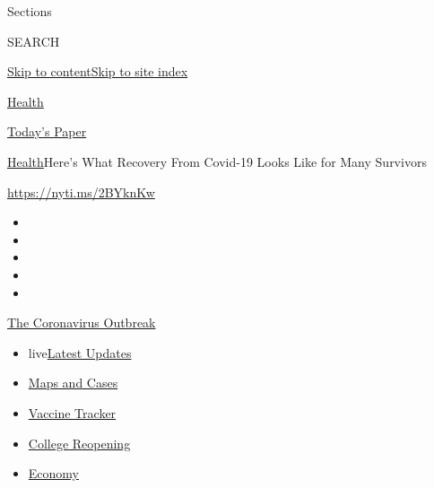 Sections

SEARCH

\protect\hyperlink{site-content}{Skip to
content}\protect\hyperlink{site-index}{Skip to site index}

\href{https://www.nytimes3xbfgragh.onion/section/health}{Health}

\href{https://myaccount.nytimes3xbfgragh.onion/auth/login?response_type=cookie\&client_id=vi}{}

\href{https://www.nytimes3xbfgragh.onion/section/todayspaper}{Today's
Paper}

\href{/section/health}{Health}\textbar{}Here's What Recovery From
Covid-19 Looks Like for Many Survivors

\url{https://nyti.ms/2BYknKw}

\begin{itemize}
\item
\item
\item
\item
\item
\end{itemize}

\href{https://www.nytimes3xbfgragh.onion/news-event/coronavirus?action=click\&pgtype=Article\&state=default\&region=TOP_BANNER\&context=storylines_menu}{The
Coronavirus Outbreak}

\begin{itemize}
\tightlist
\item
  live\href{https://www.nytimes3xbfgragh.onion/2020/08/04/world/coronavirus-covid-19.html?action=click\&pgtype=Article\&state=default\&region=TOP_BANNER\&context=storylines_menu}{Latest
  Updates}
\item
  \href{https://www.nytimes3xbfgragh.onion/interactive/2020/us/coronavirus-us-cases.html?action=click\&pgtype=Article\&state=default\&region=TOP_BANNER\&context=storylines_menu}{Maps
  and Cases}
\item
  \href{https://www.nytimes3xbfgragh.onion/interactive/2020/science/coronavirus-vaccine-tracker.html?action=click\&pgtype=Article\&state=default\&region=TOP_BANNER\&context=storylines_menu}{Vaccine
  Tracker}
\item
  \href{https://www.nytimes3xbfgragh.onion/2020/08/02/us/covid-college-reopening.html?action=click\&pgtype=Article\&state=default\&region=TOP_BANNER\&context=storylines_menu}{College
  Reopening}
\item
  \href{https://www.nytimes3xbfgragh.onion/live/2020/08/03/business/stock-market-today-coronavirus?action=click\&pgtype=Article\&state=default\&region=TOP_BANNER\&context=storylines_menu}{Economy}
\end{itemize}

